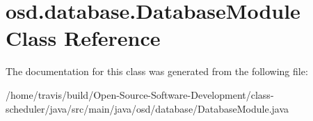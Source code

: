 \hypertarget{classosd_1_1database_1_1_database_module}{\section{osd.\-database.\-Database\-Module Class Reference}
\label{classosd_1_1database_1_1_database_module}
}


The documentation for this class was generated from the following file\-:\begin{DoxyCompactItemize}
\item 
/home/travis/build/\-Open-\/\-Source-\/\-Software-\/\-Development/class-\/scheduler/java/src/main/java/osd/database/Database\-Module.\-java\end{DoxyCompactItemize}
